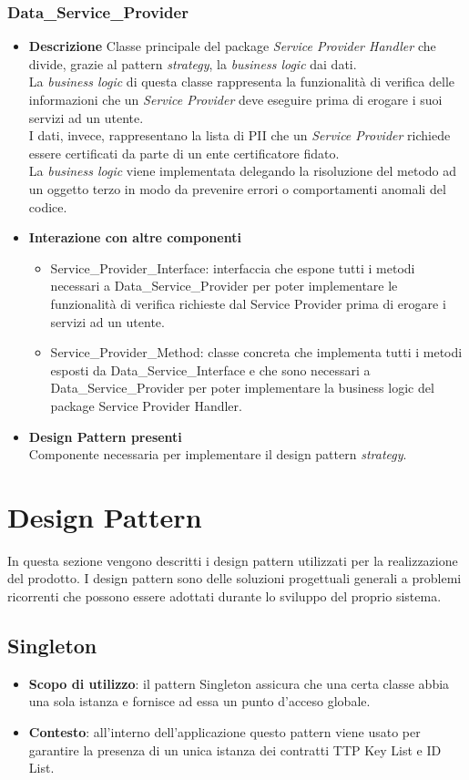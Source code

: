 \subsubsection{Data\_Service\_Provider}
\begin{itemize}
	\item \textbf{Descrizione}
	Classe principale del package \textit{Service Provider Handler} che divide, grazie al pattern \textit{strategy},
	la\textit{ business logic} dai dati.\\
	La \textit{business logic} di questa classe rappresenta la funzionalità di verifica delle informazioni
	che un \textit{Service Provider} deve eseguire prima di erogare i suoi servizi ad un utente.\\
	I dati, invece, rappresentano la lista di \gls{PII} che un \textit{Service Provider} richiede essere certificati
	da parte di un ente certificatore fidato.\\
	La\textit{ business logic} viene implementata delegando la risoluzione del metodo ad un oggetto
	terzo in modo da prevenire errori o comportamenti anomali del codice.
	\item \textbf{Interazione con altre componenti}
	\begin{itemize}
		\item Service\_Provider\_Interface: interfaccia che espone tutti i metodi necessari a Data\_Service\_Provider per poter implementare le funzionalità di verifica richieste dal Service Provider prima di erogare i servizi ad un utente.
		\item Service\_Provider\_Method: classe concreta che implementa tutti i metodi esposti da Data\_Service\_Interface e che sono necessari a Data\_Service\_Provider per poter implementare la business logic del package Service Provider Handler.
	\end{itemize}
	\item \textbf{Design Pattern presenti}\\
	Componente necessaria per implementare il design pattern \textit{strategy}.
\end{itemize}
\section{Design Pattern}
In questa sezione vengono descritti i design pattern utilizzati per la realizzazione del prodotto. I design pattern sono delle soluzioni progettuali generali a problemi ricorrenti che possono essere adottati durante lo sviluppo del proprio sistema.
\subsection{Singleton}
\begin{itemize}
	\item \textbf{Scopo di utilizzo}: il pattern Singleton assicura che una certa classe abbia una sola istanza e fornisce ad essa un punto d’acceso globale.
	\item \textbf{Contesto}: all'interno dell'applicazione questo pattern viene usato per garantire la presenza di un unica istanza dei contratti TTP Key List e ID List.
\end{itemize}
